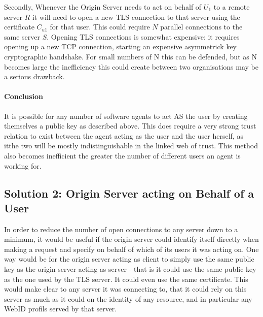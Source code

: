 \documentclass[a4paper]{llncs}
\begin{document}

Secondly, Whenever the Origin Server needs to act on behalf of $U_1$ to a remote server $R$ it will need to open a new TLS connection to that server using the certificate $C_{u1}$ for that user.
This could require $N$ parallel connections to the same server $S$. 
Opening TLS connections is somewhat expensive: it requires opening up a new TCP connection, starting an expensive asymmetrick key cryptographic handshake. 
For small numbers of N this can be defended, but as N becomes large the inefficiency this could create between two
organisations may be a serious drawback.
 
\paragraph{Conclusion}

It is possible for any number of software agents to act AS the user by creating themselves a public key as described above.
This does require a very strong trust relation to exist between the agent acting as the user and the user herself, as itthe two will be mostly indistinguishable in the linked web of trust. 
This method also becomes inefficient the greater the number of different users  an agent is working for.

 
\subsection{Solution 2: Origin Server acting on Behalf of a User}

In order to reduce the number of open connections to any server down to a minimum, it would be useful if the origin server could identify itself directly when making a request and specify on behalf of which of its users it was acting on.
One way would be for the origin server acting as client to simply use the same public key as the origin server acting as server - that is it could use the same public key as the one used by the TLS server.
It could even use the same certificate.
This would make clear to any server it was connecting to, that it could rely on this server as much as it could on the identity of any resource, and in particular any WebID profils served by that server.
\end{document}
